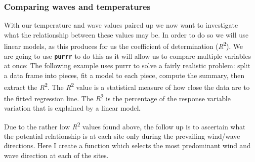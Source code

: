 \documentclass[10pt,A4,]{article}
\begin{document}
\subsubsection{Comparing waves and
temperatures}\label{comparing-waves-and-temperatures}

With our temperature and wave values paired up we now want to
investigate what the relationship between these values may be. In order
to do so we will use linear models, as this produces for us the
coefficient of determination (\emph{R}\textsuperscript{2}). We are going
to use \textbf{\texttt{purrr}} to do this as it will allow us to compare
multiple variables at once: The following example uses purrr to solve a
fairly realistic problem: split a data frame into pieces, fit a model to
each piece, compute the summary, then extract the
\emph{R}\textsuperscript{2}. The \emph{R}\textsuperscript{2} value is a
statistical measure of how close the data are to the fitted regression
line. The \emph{R}\textsuperscript{2} is the percentage of the response
variable variation that is explained by a linear model.

Due to the rather low \emph{R}\textsuperscript{2} values found above,
the follow up is to ascertain what the potential relationship is at each
site only during the prevailing wind/wave directions. Here I create a
function which selects the most predominant wind and wave direction at
each of the sites.
\end{document}

